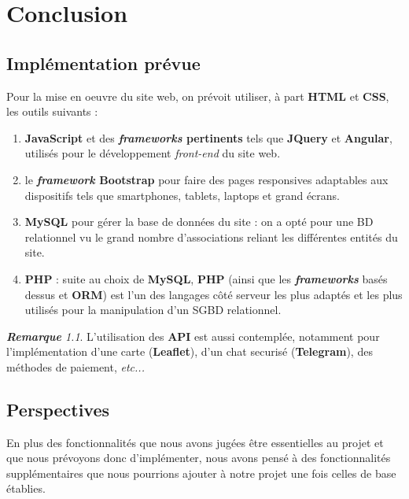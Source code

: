 \documentclass[a4paper,12pt]{book}
\theoremstyle{break}
\theoremstyle{break}
\theoremstyle{break}
\theoremstyle{break}
\theoremstyle{definition}
\theoremstyle{remark}
\newtheorem{remark}{\textbf{Remarque}}
\begin{document}
\chapter{Conclusion}
\section{Implémentation prévue}
Pour la mise en oeuvre du site web, on prévoit utiliser, à part \textbf{HTML} et \textbf{CSS}, les outils suivants :
\begin{enumerate}
  \item{\textbf{JavaScript} et des \textbf{\textit{frameworks} pertinents} tels que \textbf{JQuery} et \textbf{Angular}, utilisés pour le développement \textit{front-end} du site web.}
  \item{le \textbf{\textit{framework} Bootstrap} pour faire des pages responsives adaptables aux dispositifs tels que smartphones, tablets, laptops et grand écrans.}
  \item{\textbf{MySQL} pour gérer la base de données du site : on a opté pour une BD relationnel vu le grand nombre d'associations reliant les différentes entités du site.}
  \item{\textbf{PHP} : suite au choix de \textbf{MySQL}, \textbf{PHP} (ainsi que les \textbf{\textit{frameworks}} basés dessus et \textbf{ORM}) est l'un des langages côté serveur les plus adaptés et les plus utilisés pour la manipulation d'un SGBD relationnel.}
\end{enumerate}

\begin{remark}
L'utilisation des \textbf{API} est aussi contemplée, notamment pour l'implémentation d'une carte (\textbf{Leaflet}), d'un chat securisé (\textbf{Telegram}), des méthodes de paiement, \textit{etc...}
\end{remark}
\section{Perspectives}
En plus des fonctionnalités que nous avons jugées être essentielles au projet et que nous prévoyons donc d'implémenter, nous avons pensé à des fonctionnalités supplémentaires que nous pourrions ajouter à notre projet une fois celles de base établies.
\end{document}
